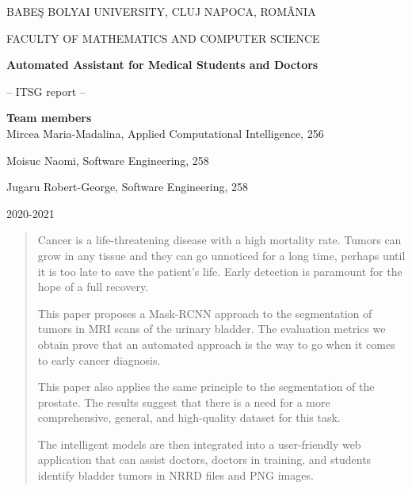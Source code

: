 \documentclass[runningheads,a4paper,11pt]{report}
\begin{document}
\begin{titlepage}
\sloppy

\begin{center}
BABE\c S BOLYAI UNIVERSITY, CLUJ NAPOCA, ROM\^ ANIA

FACULTY OF MATHEMATICS AND COMPUTER SCIENCE

\vspace{6cm}

\Huge \textbf{Automated Assistant for Medical Students and Doctors}

\vspace{1cm}

\normalsize -- ITSG report --

\end{center}


\vspace{5cm}

\begin{flushright}
\Large{\textbf{Team members}}\\
Mircea Maria-Madalina, Applied Computational Intelligence, 256

Moisuc Naomi, Software Engineering, 258

Jugaru Robert-George, Software Engineering, 258
\end{flushright}

\vspace{4cm}

\begin{center}
2020-2021
\end{center}

\end{titlepage}


\begin{abstract}

Cancer is a life-threatening disease with a high mortality rate. Tumors can grow in any tissue and they can go unnoticed for a long time, perhaps until it is too late to save the patient's life. Early detection is paramount for the hope of a full recovery. 

This paper proposes a Mask-RCNN approach to the segmentation of tumors in MRI scans of the urinary bladder. The evaluation metrics we obtain prove that an automated approach is the way to go when it comes to early cancer diagnosis. 

This paper also applies the same principle to the segmentation of the prostate. The results suggest that there is a need for a more comprehensive, general, and high-quality dataset for this task.

The intelligent models are then integrated into a user-friendly web application that can assist doctors, doctors in training, and students identify bladder tumors in NRRD files and PNG images.
	
\end{abstract}
\end{document}
